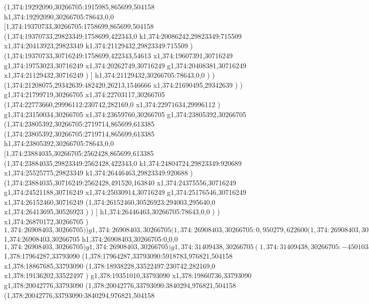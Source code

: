 {(1,374:19292090,30266705:1915985,865699,504158
h1,374:19292090,30266705:78643,0,0
[1,374:19370733,30266705:1758699,865699,504158
(1,374:19370733,29823349:1758699,422343,0
k1,374:20086242,29823349:715509
x1,374:20413923,29823349
k1,374:21129432,29823349:715509
)
(1,374:19370733,30716249:1758699,422343,54613
x1,374:19607391,30716249
g1,374:19753023,30716249
x1,374:20262749,30716249
g1,374:20408381,30716249
x1,374:21129432,30716249
)
]
h1,374:21129432,30266705:78643,0,0
)
)
(1,374:21208075,29342639:482420,26213,1546666
x1,374:21690495,29342639
)
)
g1,374:21799719,30266705
x1,374:22703117,30266705
(1,374:22773660,29996112:230742,282169,0
x1,374:22971634,29996112
)
g1,374:23150034,30266705
x1,374:23659760,30266705
g1,374:23805392,30266705
(1,374:23805392,30266705:2719714,865699,613385
(1,374:23805392,30266705:2719714,865699,613385
h1,374:23805392,30266705:78643,0,0
[1,374:23884035,30266705:2562428,865699,613385
(1,374:23884035,29823349:2562428,422343,0
k1,374:24804724,29823349:920689
x1,374:25525775,29823349
k1,374:26446463,29823349:920688
)
(1,374:23884035,30716249:2562428,491520,163840
x1,374:24375556,30716249
g1,374:24521188,30716249
x1,374:25030914,30716249
g1,374:25176546,30716249
x1,374:26152460,30716249
(1,374:26152460,30526923:294003,295640,0
x1,374:26413695,30526923
)
)
]
h1,374:26446463,30266705:78643,0,0
)
)
x1,374:26870172,30266705
)
$1,374:26908403,30266705
)
)
g1,374:26908403,30266705
(1,374:26908403,30266705:0,950279,622600
(1,374:26908403,30266705:0,0,0
$1,374:26908403,30266705
h1,374:26908403,30266705:0,0,0
$1,374:26908403,30266705
)
g1,374:26908403,30266705
)
g1,374:31409438,30266705
(1,374:31409438,30266705:-4501035,950279,622600
)
g1,374:26908403,30266705
)
(1,376:10437920,32016627:20971518,455111,127431
x1,376:11493781,32016627
g1,375:11712234,32016627
x1,375:12660688,32016627
x1,375:12988369,32016627
x1,375:13261435,32016627
k1,376:31409438,32016627:18148003
g1,376:31409438,32016627
)
(1,378:10437920,33793090:13445150,976821,504158
g1,378:17964287,33793090
(1,378:17964287,33793090:5918783,976821,504158
g1,378:17964287,33793090
(1,378:17964287,33793090:0,550500,235932
[1,378:17964287,33793090:0,550500,235932
(1,21:17964287,33793090:0,550500,235932
r1,378:17964287,33793090:0,786432,235932
)
]
)
(1,378:17964287,33793090:5918783,976821,504158
$1,378:17964287,33793090
(1,378:17964287,33793090:5918783,976821,504158
x1,378:18867685,33793090
(1,378:18938228,33522497:230742,282169,0
x1,378:19136202,33522497
)
g1,378:19351010,33793090
x1,378:19860736,33793090
g1,378:20042776,33793090
(1,378:20042776,33793090:3840294,976821,504158
(1,378:20042776,33793090:3840294,976821,504158
}
